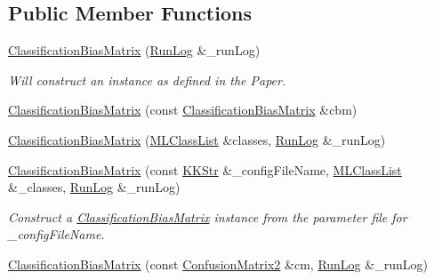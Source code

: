 \subsection*{Public Member Functions}
\begin{DoxyCompactItemize}
\item 
\hyperlink{class_k_k_m_l_l_1_1_classification_bias_matrix_a12699ec8b195fde4b17c3c4e84b33e9d}{Classification\+Bias\+Matrix} (\hyperlink{class_k_k_m_l_l_1_1_classification_bias_matrix_ab6fc6dde0c82d6a5420851c07efb6184}{Run\+Log} \&\+\_\+run\+Log)
\begin{DoxyCompactList}\small\item\em Will construct an instance as defined in the Paper. \end{DoxyCompactList}\item 
\hyperlink{class_k_k_m_l_l_1_1_classification_bias_matrix_aec1e8c3b3c6d63816c7d1e5a878d33bb}{Classification\+Bias\+Matrix} (const \hyperlink{class_k_k_m_l_l_1_1_classification_bias_matrix}{Classification\+Bias\+Matrix} \&cbm)
\item 
\hyperlink{class_k_k_m_l_l_1_1_classification_bias_matrix_a3db082018e09ace8488978def90f92af}{Classification\+Bias\+Matrix} (\hyperlink{class_k_k_m_l_l_1_1_m_l_class_list}{M\+L\+Class\+List} \&classes, \hyperlink{class_k_k_m_l_l_1_1_classification_bias_matrix_ab6fc6dde0c82d6a5420851c07efb6184}{Run\+Log} \&\+\_\+run\+Log)
\item 
\hyperlink{class_k_k_m_l_l_1_1_classification_bias_matrix_aa0961390599cf7c869dc1c00da3dd660}{Classification\+Bias\+Matrix} (const \hyperlink{class_k_k_m_l_l_1_1_classification_bias_matrix_a80f330b2f5e53d06e2a347b5e16f9f86}{K\+K\+Str} \&\+\_\+config\+File\+Name, \hyperlink{class_k_k_m_l_l_1_1_m_l_class_list}{M\+L\+Class\+List} \&\+\_\+classes, \hyperlink{class_k_k_m_l_l_1_1_classification_bias_matrix_ab6fc6dde0c82d6a5420851c07efb6184}{Run\+Log} \&\+\_\+run\+Log)
\begin{DoxyCompactList}\small\item\em Construct a \hyperlink{class_k_k_m_l_l_1_1_classification_bias_matrix}{Classification\+Bias\+Matrix} instance from the parameter file for \textquotesingle{}\+\_\+config\+File\+Name\textquotesingle{}. \end{DoxyCompactList}\item 
\hyperlink{class_k_k_m_l_l_1_1_classification_bias_matrix_ae9be1266ba3a172af394b9e9400bff98}{Classification\+Bias\+Matrix} (const \hyperlink{class_k_k_m_l_l_1_1_confusion_matrix2}{Confusion\+Matrix2} \&cm, \hyperlink{class_k_k_m_l_l_1_1_classification_bias_matrix_ab6fc6dde0c82d6a5420851c07efb6184}{Run\+Log} \&\+\_\+run\+Log)

\end{DoxyCompactItemize}
